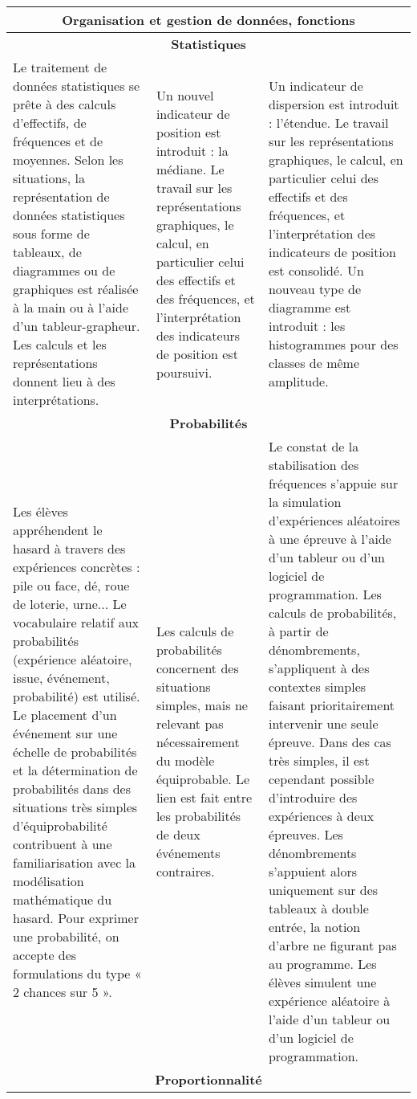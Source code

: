 \documentclass[11pt]{article}
\newcommand{\categorie}[1]{\hline\multicolumn{3}{|c|}{\color{white}\LARGE\cellcolor{bleu}\sffamily\phantom{É} #1 \phantom{É}}\rmfamily \\\hline}
\newcommand{\souscategorie}[1]{\hline\multicolumn{3}{|c|}{\color{bleu}\Large\bf\rmfamily\phantom{É}#1\phantom{É}\rmfamily}\\\hline}
\newenvironment{programme}
{
    \setlength{\arrayrulewidth}{0.5pt}
    \arrayrulecolor{bleu}
    \begin{center}
    \begin{tabular}{|p{6.4cm}|p{6.4cm}|p{6.4cm}|}
}
{
    \hline
    \end{tabular}
    \end{center}
}
\begin{document}
\begin{programme}
    \categorie{Organisation et gestion de données, fonctions}
    \souscategorie{Statistiques}
    Le traitement de données statistiques se prête à des calculs d’effectifs, de fréquences et de moyennes. Selon les situations, la représentation de données statistiques sous forme de tableaux, de diagrammes ou de graphiques est réalisée à la main ou à l’aide d’un tableur-grapheur. Les calculs et les représentations donnent lieu à des interprétations. & Un nouvel indicateur de position est introduit : la médiane. Le travail sur les représentations graphiques, le calcul, en particulier celui des effectifs et des fréquences, et l’interprétation des indicateurs de position est poursuivi. & Un indicateur de dispersion est introduit : l’étendue. Le travail sur les représentations graphiques, le calcul, en particulier celui des effectifs et des fréquences, et l’interprétation des indicateurs de position est consolidé. Un nouveau type de diagramme est introduit : les histogrammes pour des classes de même amplitude. \\
    \souscategorie{Probabilités}
    Les élèves appréhendent le hasard à travers des expériences concrètes : pile ou face, dé, roue de loterie, urne... Le vocabulaire relatif aux probabilités (expérience aléatoire, issue, événement, probabilité) est utilisé. Le placement d’un événement sur une échelle de probabilités et la détermination de probabilités dans des situations très simples d’équiprobabilité contribuent à une familiarisation avec la modélisation mathématique du hasard. Pour exprimer une probabilité, on accepte des formulations du type « 2 chances sur 5 ». & Les calculs de probabilités concernent des situations simples, mais ne relevant pas nécessairement du modèle équiprobable. Le lien est fait entre les probabilités de deux événements contraires. & Le constat de la stabilisation des fréquences s’appuie sur la simulation d’expériences aléatoires à une épreuve à l’aide d’un tableur ou d’un logiciel de programmation. Les calculs de probabilités, à partir de dénombrements, s’appliquent à des contextes simples faisant prioritairement intervenir une seule épreuve. Dans des cas très simples, il est cependant possible d’introduire des expériences à deux épreuves. Les dénombrements s’appuient alors uniquement sur des tableaux à double entrée, la notion d’arbre ne figurant pas au programme. Les élèves simulent une expérience aléatoire à l’aide d’un tableur ou d’un logiciel de programmation. \\
    \souscategorie{Proportionnalité}

\end{programme}
\end{document}
